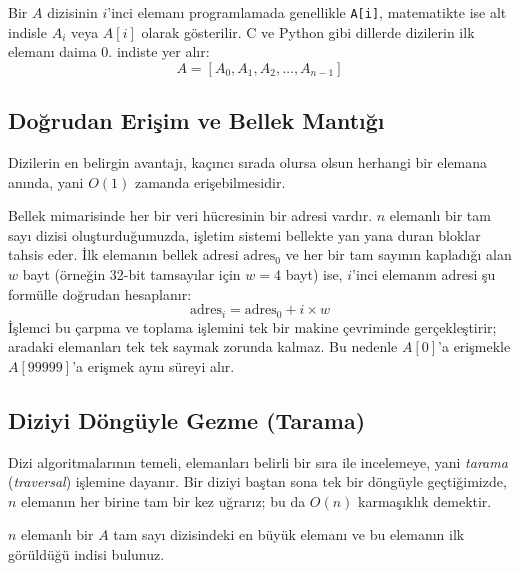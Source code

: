 Bir $A$ dizisinin $i$'inci elemanı programlamada genellikle \texttt{A[i]}, matematikte ise alt indisle $A_i$ veya $A[i]$ olarak gösterilir. C ve Python gibi dillerde dizilerin ilk elemanı daima $0$. indiste yer alır:
\[
A = [A_0, A_1, A_2, \dots, A_{n-1}]
\]

\subsection{Doğrudan Erişim ve Bellek Mantığı}
Dizilerin en belirgin avantajı, kaçıncı sırada olursa olsun herhangi bir elemana anında, yani $O(1)$ zamanda erişebilmesidir. 

Bellek mimarisinde her bir veri hücresinin bir adresi vardır. $n$ elemanlı bir tam sayı dizisi oluşturduğumuzda, işletim sistemi bellekte yan yana duran bloklar tahsis eder. İlk elemanın bellek adresi $\text{adres}_0$ ve her bir tam sayının kapladığı alan $w$ bayt (örneğin 32-bit tamsayılar için $w = 4$ bayt) ise, $i$'inci elemanın adresi şu formülle doğrudan hesaplanır:
\[
\text{adres}_i = \text{adres}_0 + i \times w
\]
İşlemci bu çarpma ve toplama işlemini tek bir makine çevriminde gerçekleştirir; aradaki elemanları tek tek saymak zorunda kalmaz. Bu nedenle $A[0]$'a erişmekle $A[99999]$'a erişmek aynı süreyi alır.

\subsection{Diziyi Döngüyle Gezme (Tarama)}
Dizi algoritmalarının temeli, elemanları belirli bir sıra ile incelemeye, yani \emph{tarama} (\emph{traversal}) işlemine dayanır. Bir diziyi baştan sona tek bir döngüyle geçtiğimizde, $n$ elemanın her birine tam bir kez uğrarız; bu da $O(n)$ karmaşıklık demektir.

\begin{example}
$n$ elemanlı bir $A$ tam sayı dizisindeki en büyük elemanı ve bu elemanın ilk görüldüğü indisi bulunuz.
\end{example}

